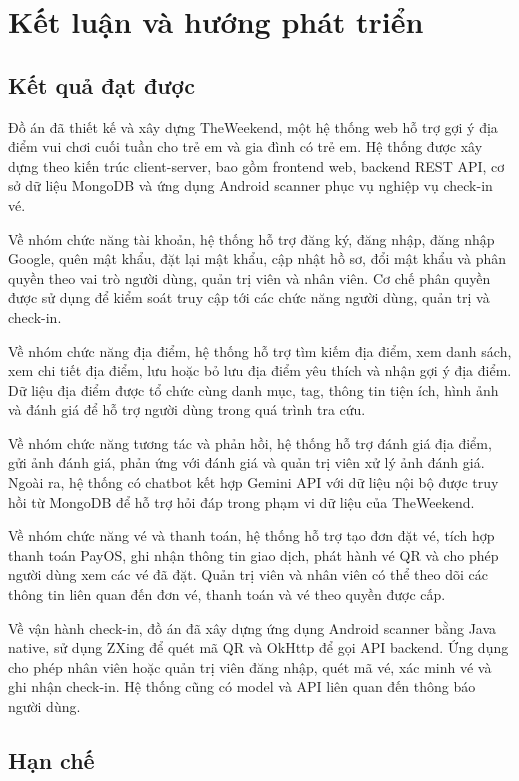 \documentclass[../DoAn.tex]{subfiles}
\begin{document}
\chapter{Kết luận và hướng phát triển}

\section{Kết quả đạt được}

Đồ án đã thiết kế và xây dựng TheWeekend, một hệ thống web hỗ trợ gợi ý địa điểm vui chơi cuối tuần cho trẻ em và gia đình có trẻ em. Hệ thống được xây dựng theo kiến trúc client-server, bao gồm frontend web, backend REST API, cơ sở dữ liệu MongoDB và ứng dụng Android scanner phục vụ nghiệp vụ check-in vé.

Về nhóm chức năng tài khoản, hệ thống hỗ trợ đăng ký, đăng nhập, đăng nhập Google, quên mật khẩu, đặt lại mật khẩu, cập nhật hồ sơ, đổi mật khẩu và phân quyền theo vai trò người dùng, quản trị viên và nhân viên. Cơ chế phân quyền được sử dụng để kiểm soát truy cập tới các chức năng người dùng, quản trị và check-in.

Về nhóm chức năng địa điểm, hệ thống hỗ trợ tìm kiếm địa điểm, xem danh sách, xem chi tiết địa điểm, lưu hoặc bỏ lưu địa điểm yêu thích và nhận gợi ý địa điểm. Dữ liệu địa điểm được tổ chức cùng danh mục, tag, thông tin tiện ích, hình ảnh và đánh giá để hỗ trợ người dùng trong quá trình tra cứu.

Về nhóm chức năng tương tác và phản hồi, hệ thống hỗ trợ đánh giá địa điểm, gửi ảnh đánh giá, phản ứng với đánh giá và quản trị viên xử lý ảnh đánh giá. Ngoài ra, hệ thống có chatbot kết hợp Gemini API với dữ liệu nội bộ được truy hồi từ MongoDB để hỗ trợ hỏi đáp trong phạm vi dữ liệu của TheWeekend.

Về nhóm chức năng vé và thanh toán, hệ thống hỗ trợ tạo đơn đặt vé, tích hợp thanh toán PayOS, ghi nhận thông tin giao dịch, phát hành vé QR và cho phép người dùng xem các vé đã đặt. Quản trị viên và nhân viên có thể theo dõi các thông tin liên quan đến đơn vé, thanh toán và vé theo quyền được cấp.

Về vận hành check-in, đồ án đã xây dựng ứng dụng Android scanner bằng Java native, sử dụng ZXing để quét mã QR và OkHttp để gọi API backend. Ứng dụng cho phép nhân viên hoặc quản trị viên đăng nhập, quét mã vé, xác minh vé và ghi nhận check-in. Hệ thống cũng có model và API liên quan đến thông báo người dùng.

\section{Hạn chế}
\end{document}
